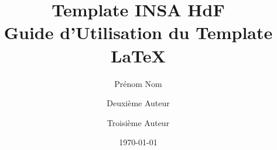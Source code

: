 \def\projecttitle{Guide d'Utilisation du Template \LaTeX}
\def\projecticonl{1_cover/meta/insa.pdf} %
\def\projecticonr{1_cover/meta/uphf.pdf}       %

\title{
    \vspace{1.5cm}Template INSA HdF \\ 
    \vspace{0.25cm} \LARGE{\textbf{\projecttitle}}
}

\author[1]{Prénom Nom}
\author[2]{Deuxième Auteur}
\author[3]{Troisième Auteur}


\date{\today}

\def\tutors{
    \addtutor{PrénomTuteur}{NomTuteur}{adressetutor@etablissement.fr}
}

\def\varkeywords{
    LaTeX, Template, Guide d'utilisation, Overleaf, Structure de projet, 
    Fichiers de configuration, Packages, Commandes personnalisées, 
    Variables globales, Mise en page, En-têtes et pieds de page, 
    Figures et images, Tableaux, Graphiques, TikZ, PGFPlots, 
    Bibliographie, BibTeX, Références, Documentation, Ingénierie collaborative, 
    Rédaction scientifique, Document technique.
}



\lstset{style=mystyle}